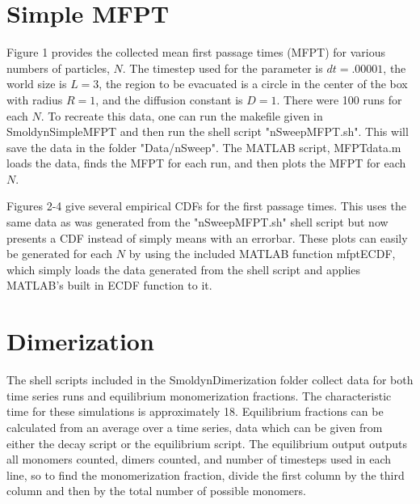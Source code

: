 \documentclass{article}
\begin{document}
\section{Simple MFPT}

Figure 1 provides the collected mean first passage times (MFPT) for various numbers of particles, $N$. The timestep used for the parameter is $dt = .00001$, the world size is $L=3$, the region to be evacuated is a circle in the center of the box with radius $R = 1$, and the diffusion constant is $D=1$. There were 100 runs for each $N$. To recreate this data, one can run the makefile given in SmoldynSimpleMFPT and then run the shell script "nSweepMFPT.sh". This will save the data in the folder "Data/nSweep". The MATLAB script, MFPTdata.m loads the data, finds the MFPT for each run, and then plots the MFPT for each $N$.

Figures 2-4 give several empirical CDFs for the first passage times. This uses the same data as was generated from the "nSweepMFPT.sh" shell script but now presents a CDF instead of simply means with an errorbar. These plots can easily be generated for each $N$ by using the included MATLAB function mfptECDF, which simply loads the data generated from the shell script and applies MATLAB's built in ECDF function to it.

\section{Dimerization}

The shell scripts included in the SmoldynDimerization folder collect data for both time series runs and equilibrium monomerization fractions. The characteristic time for these simulations is approximately 18. Equilibrium fractions can be calculated from an average over a time series, data which can be given from either the decay script or the equilibrium script. The equilibrium output outputs all monomers counted, dimers counted, and number of timesteps used in each line, so to find the monomerization fraction, divide the first column by the third column and then by the total number of possible monomers.
\end{document}
